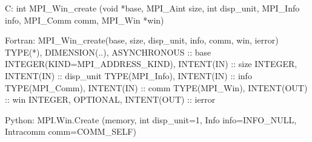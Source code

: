 C:
int MPI_Win_create
   (void *base, MPI_Aint size, int disp_unit,
    MPI_Info info, MPI_Comm comm, MPI_Win *win)

Fortran:
MPI_Win_create(base, size, disp_unit, info, comm, win, ierror)
TYPE(*), DIMENSION(..), ASYNCHRONOUS :: base
INTEGER(KIND=MPI_ADDRESS_KIND), INTENT(IN) :: size
INTEGER, INTENT(IN) :: disp_unit
TYPE(MPI_Info), INTENT(IN) :: info
TYPE(MPI_Comm), INTENT(IN) :: comm
TYPE(MPI_Win), INTENT(OUT) :: win
INTEGER, OPTIONAL, INTENT(OUT) :: ierror

Python:
MPI.Win.Create
   (memory, int disp_unit=1,
    Info info=INFO_NULL, Intracomm comm=COMM_SELF)
